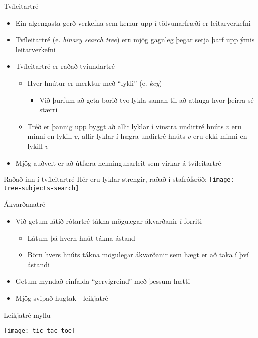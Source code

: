 \documentclass[handout]{beamer}
\begin{document}
\begin{frame}{Tvíleitartré}
\begin{itemize}
 \item Ein algengasta gerð verkefna sem kemur upp í tölvunarfræði er leitarverkefni
 \item Tvíleitartré (e. \emph{binary search tree}) eru mjög gagnleg þegar setja þarf upp ýmis leitarverkefni
 \item Tvíleitartré er raðað tvíundartré
 \begin{itemize}
  \item Hver hnútur er merktur með ``lykli'' (e. \emph{key})
  \begin{itemize}
   \item Við þurfum að geta borið tvo lykla saman til að athuga hvor þeirra sé stærri
  \end{itemize}
  \item Tréð er þannig upp byggt að allir lyklar í vinstra undirtré hnúts $v$ eru minni en lykill $v$, allir lyklar í hægra undirtré hnúts $v$ eru ekki minni en lykill $v$
 \end{itemize}
 \item Mjög auðvelt er að útfæra helmingunarleit sem virkar á tvíleitartré
\end{itemize}
\end{frame}

\begin{frame}{Raðað inn í tvíleitartré}
Hér eru lyklar strengir, raðað í stafrófsröð:
\texttt{[image: tree-subjects-search]}
\end{frame}

\begin{frame}{Ákvarðanatré}
\begin{itemize}
 \item Við getum látið rótartré tákna mögulegar ákvarðanir í forriti
 \begin{itemize}
  \item Látum þá hvern hnút tákna ástand
  \item Börn hvers hnúts tákna mögulegar ákvarðanir sem hægt er að taka í því ástandi
 \end{itemize}
 \item Getum myndað einfalda ``gervigreind'' með þessum hætti
 \item Mjög svipað hugtak - leikjatré
\end{itemize}
\end{frame}

\begin{frame}{Leikjatré myllu}
\begin{center}
\texttt{[image: tic-tac-toe]}
\end{center}
\end{frame}
\end{document}
